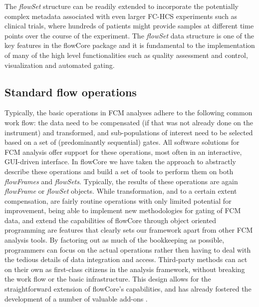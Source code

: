 \documentclass[10pt]{bmc_article}
\newcommand{\Rpackage}[1]{{\textsf{#1}}}
\newcommand{\Rclass}[1]{{\textit{#1}}}
\newenvironment{bmcformat}{\begin{raggedright}\baselineskip20pt\sloppy\setboolean{publ}{false}}{\end{raggedright}\baselineskip20pt\sloppy}
\begin{document}
\begin{bmcformat}
The \Rclass{flowSet} structure can be readily extended to incorporate
the potentially complex metadata associated with even larger FC-HCS
experiments such as clinical trials, where hundreds of patients might
provide samples at different time points over the course of the
experiment. The \Rclass{flowSet} data structure is one of the key
features in the \Rpackage{flowCore} package and it is fundamental to
the implementation of many of the high level functionalities such as
quality assessment and control, visualization and automated gating.

\subsection*{Standard flow operations}
Typically, the basic operations in FCM analyses adhere to the
following common work flow: the data need to be compensated (if that
was not already done on the instrument) and transformed, and
sub-populations of interest need to be selected based on a set of
(predominantly sequential) gates. All software solutions for FCM
analysis offer support for these operations, most often in an
interactive, GUI-driven interface. In \Rpackage{flowCore} we have
taken the approach to abstractly describe these operations and build a
set of tools to perform them on both \Rclass{flowFrames} and
\Rclass{flowSets}. Typically, the results of these operations are
again \Rclass{flowFrame} or \Rclass{flowSet} objects. While
transformation, and to a certain extent compensation, are fairly
routine operations with only limited potential for improvement, being
able to implement new methodologies for gating of FCM data, and
extend the capabilities of \Rpackage{flowCore} through object
oriented programming are features that clearly sets our framework
apart from other FCM analysis tools. By factoring out as much of the
bookkeeping as possible, programmers can focus on the actual
operations rather then having to deal with the tedious details of data
integration and access. Third-party methods can act on their own as
first-class citizens in the analysis framework, without breaking the
work flow or the basic infrastructure. This design allows for the
straightforward extension of \Rpackage{flowCore}'s capabilities, and
has already fostered the development of a number of valuable add-ons
\cite{lo2008agf,sarkar2008ufv}.


\end{bmcformat}
\end{document}
